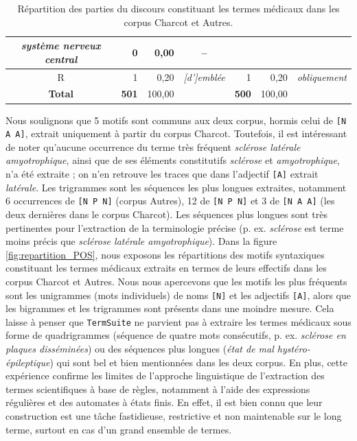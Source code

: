 \begin{table}[h]
{\begin{tabular}{|lrrr|rrl|}
			\multicolumn{1}{c|}{\textit{système nerveux central}} &
			\multicolumn{1}{r|}{0}                 & \multicolumn{1}{r|}{0,00}           &
			\multicolumn{1}{c|}{--}         \\ \hline
			\multicolumn{1}{|c|}{\textsc{R}}              & \multicolumn{1}{r|}{1}                 & \multicolumn{1}{r|}{0,20}                    &
			\multicolumn{1}{c|}{\textit{[d']emblée}} &
			\multicolumn{1}{r|}{1}                 & \multicolumn{1}{r|}{0,20}       &
			\multicolumn{1}{c|}{\textit{obliquement}}             \\ \hline\hline
			\multicolumn{1}{|c|}{\textbf{Total}} & \multicolumn{1}{r|}{\textbf{501}}      & \multicolumn{1}{r|}{100,00}                  &
			\multicolumn{1}{r|}{\cellcolor{blue!25}} &
			\multicolumn{1}{r|}{\textbf{500}}      & \multicolumn{1}{r|}{100,00} &
			\multicolumn{1}{r|}{\cellcolor{blue!25}}                 \\ \hline\hline
		\end{tabular}
	}
	\caption{Répartition des parties du discours constituant les termes médicaux dans les corpus \og{}Charcot\fg{} et \og{}Autres\fg{}.}
	\label{tab:repartition_POS}
\end{table}
Nous soulignons que 5 motifs sont communs aux deux corpus, hormis celui de \texttt{[N A A]}, extrait uniquement à partir du corpus \og{}Charcot\fg{}. Toutefois, il est intéressant de noter qu'aucune occurrence du terme très fréquent \textit{sclérose latérale amyotrophique}, ainsi que de ses éléments constitutifs \textit{sclérose} et \textit{amyotrophique}, n'a été extraite ; on n'en retrouve les traces que dans l'adjectif \texttt{[A]} extrait \textit{latérale}. Les trigrammes sont les séquences les plus longues extraites, notamment 6 occurrences de \texttt{[N P N]} (corpus \og{}Autres\fg{}), 12 de \texttt{[N P N]} et 3 de \texttt{[N A A]} (les deux dernières dans le corpus \og{}Charcot\fg{}). Les séquences plus longues sont très pertinentes pour l'extraction de la terminologie précise (p. ex. \textit{sclérose} est terme moins précis que \textit{sclérose latérale amyotrophique}). Dans la figure \ref{fig:repartition_POS}, nous exposons les répartitions des motifs syntaxiques constituant les termes médicaux extraits en termes de leurs effectifs dans les corpus \og{}Charcot\fg{} et \og{}Autres\fg{}. Nous nous apercevons que les motifs les plus fréquents sont les unigrammes (mots individuels) de noms \texttt{[N]} et les adjectifs \texttt{[A]}, alors que les bigrammes et les trigrammes sont présents dans une moindre mesure. Cela laisse à penser que \texttt{TermSuite} ne parvient pas à extraire les termes médicaux sous forme de quadrigrammes (séquence de quatre mots consécutifs, p. ex. \textit{sclérose en plaques disséminées}) ou des séquences plus longues (\textit{état de mal hystéro-épileptique}) qui sont bel et bien mentionnées dans les deux corpus. En plus, cette expérience confirme les limites de l'approche linguistique de l'extraction des termes scientifiques à base de règles, notamment à l'aide des expressions régulières et des automates à états finis. En effet, il est bien connu que leur construction est une tâche fastidieuse, restrictive et non maintenable sur le long terme, surtout en cas d'un grand ensemble de termes.


